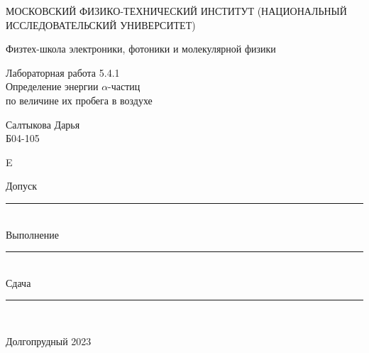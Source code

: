 \documentclass[a4paper,12pt]{article} %
\begin{document}
\newenvironment{lines}[1][\textwidth] %
{
\newcolumntype{E}{>{}p{#1}<{\hrulefill}} %
\begin{flushright} %
\begin{tabular}[h]{E} %
}
{\end{tabular}\end{flushright}
}
	
	\begin{titlepage}
	\begin{center}
		{\large МОСКОВСКИЙ ФИЗИКО-ТЕХНИЧЕСКИЙ ИНСТИТУТ (НАЦИОНАЛЬНЫЙ ИССЛЕДОВАТЕЛЬСКИЙ УНИВЕРСИТЕТ)}
	\end{center}
	\begin{center}
		{\large Физтех-школа электроники, фотоники и молекулярной физики}
	\end{center}
	
	
	\vspace{4.5cm}
	{\huge
		\begin{center}
			{Лабораторная работа 5.4.1}\\
			Определение энергии $\alpha$-частиц\\по величине их пробега в воздухе
		\end{center}
	}
	\vspace{2cm}
	\begin{flushright}
		{\LARGE Салтыкова Дарья \\
			\vspace{0.5cm}
			Б04-105}
	\end{flushright}
	
	\vspace{0.5cm}
	
	\begin{lines}[.5
	\textwidth]
  {\LARGE Допуск} \rule{6.5cm}{0.25pt} \vspace{0.5cm}\\
 {\LARGE Выполнение} \rule{3cm}{0.25pt}\vspace{0.5cm} \\ {\LARGE Сдача} \rule{3cm}{0.25pt} \\ %
\end{lines}
	\vspace{6cm}
	\begin{center}
		Долгопрудный 2023
	\end{center}
\end{titlepage}
\end{document}
